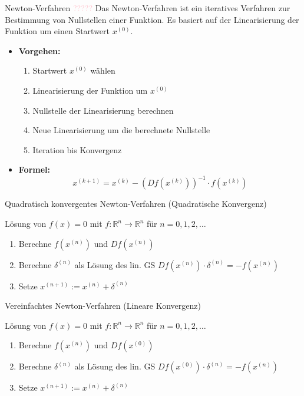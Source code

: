 \begin{concept}{Newton-Verfahren} \textcolor{pink}{?????}
    Das Newton-Verfahren ist ein iteratives Verfahren zur Bestimmung von Nullstellen einer Funktion. Es basiert auf der Linearisierung der Funktion um einen Startwert $x^{(0)}$.
    \begin{itemize}
        \item \textbf{Vorgehen:}
        \begin{enumerate}
            \item Startwert $x^{(0)}$ wählen
            \item Linearisierung der Funktion um $x^{(0)}$
            \item Nullstelle der Linearisierung berechnen
            \item Neue Linearisierung um die berechnete Nullstelle
            \item Iteration bis Konvergenz
        \end{enumerate}
        \item \textbf{Formel:}
        $$
        x^{(k+1)}=x^{(k)}-\left(D f\left(x^{(k)}\right)\right)^{-1} \cdot f\left(x^{(k)}\right)
        $$
    \end{itemize}
\end{concept}

\begin{concept}{Quadratisch konvergentes Newton-Verfahren} (Quadratische Konvergenz)
    
    Lösung von $f(x)=0$ mit $f: \mathbb{R}^n \rightarrow \mathbb{R}^n$ für $n=0,1,2, \ldots$
    \begin{enumerate}
        \item Berechne $f\left(x^{(n)}\right)$ und $D f\left(x^{(n)}\right)$
        \item Berechne $\delta^{(n)}$ als Lösung des lin. GS $D f\left(x^{(n)}\right) \cdot \delta^{(n)}=-f\left(x^{(n)}\right)$
        \item Setze $x^{(n+1)}:=x^{(n)}+\delta^{(n)}$
    \end{enumerate}
\end{concept}

\begin{theorem}{Vereinfachtes Newton-Verfahren} (Lineare Konvergenz)

    Lösung von $f(x)=0$ mit $f: \mathbb{R}^n \rightarrow \mathbb{R}^n$ für $n=0,1,2, \ldots$
    \begin{enumerate}
        \item Berechne $f\left(x^{(n)}\right)$ und $D f\left(x^{(0)}\right)$
        \item Berechne $\delta^{(n)}$ als Lösung des lin. GS $D f\left(x^{(0)}\right) \cdot \delta^{(n)}=-f\left(x^{(n)}\right)$
        \item Setze $x^{(n+1)}:=x^{(n)}+\delta^{(n)}$
    \end{enumerate}
\end{theorem}

